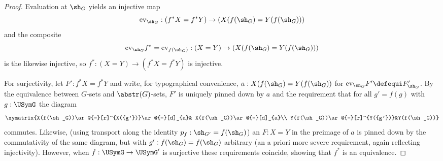 \begin{proof}
  Evaluation at $\sh_G$  yields an injective map
$$\mathrm{ev}_{\sh_G}:(f^*X=f^*Y)\to(X(f(\sh_G)=Y(f(\sh_G)))$$ and the composite
$$\mathrm{ev}_{\sh_G}f^*=\mathrm{ev}_{f(\sh_G)}:(X=Y)\to(X(f(\sh_G)=Y(f(\sh_G)))$$
 is the likewise injective, so $f^*:(X=Y)\to(f^*X=f^*Y)$ is injective.

For surjectivity, let $F':f^*X=f^*Y$ and write, for typographical convenience, $a:X(f(\sh_G)=Y(f(\sh_G))$ for $\mathrm{ev}_{\sh_G}F'\defequi F'_{\sh_G}$.
By the equivalence between $G$-sets and $\abstr(G)$-sets, $F'$ is uniquely pinned down by $a$ and the requirement that for all $g'=f(g)$ with $g:\USymG$ the diagram
$$\xymatrix{X(f(\sh_G))\ar@{=}[r]^{X({g'})}\ar@{=}[d]_{a}&
  X(f(\sh_G))\ar@{=}[d]_{a}\\
  Y(f(\sh_G))\ar@{=}[r]^{Y({g'})}&Y(f(\sh_G))}
$$
commutes.  Likewise, (using transport along the identity $p_f:\sh_{G'}=f(\sh_G)$) an $F:X=Y$ in the preimage of $a$ is pinned down by the commutativity of the same diagram, but with $g':f(\sh_G)=f(\sh_G)$ arbitrary (an a priori more severe requirement, again reflecting injectivity).   However, when $f:\USymG\to\USymG'$ is surjective these requirements coincide, showing that $f^*$ is an equivalence.





\end{proof}



